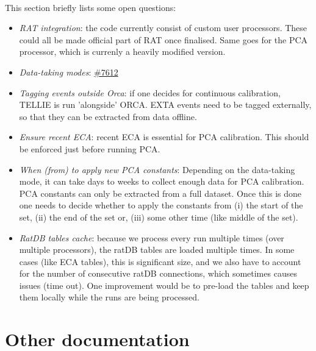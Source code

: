 \documentclass[12pt]{article}
\begin{document}
\paragraph{}
This section briefly lists some open questions:
\begin{itemize}
	\item \textit{RAT integration}: the code currently consist of custom user processors. These could all be made official part of RAT once finalised. Same goes for the PCA processor, which is currenly a heavily modified version.
	\item \textit{Data-taking modes}: \href{https://www.snolab.ca/snoplus/private/DocDB/cgi/ShowDocument?docid=7612}{\#7612}
	\item \textit{Tagging events outside Orca}: if one decides for continuous calibration, TELLIE is run 'alongside' ORCA. EXTA events need to be tagged externally, so that they can be extracted from data offline.
	\item \textit{Ensure recent ECA}: recent ECA is essential for PCA calibration. This should be enforced just before running PCA.
	\item \textit{When (from) to apply new PCA constants}: Depending on the data-taking mode, it can take days to weeks to collect enough data for PCA calibration. PCA constants can only be extracted from a full dataset. Once this is done one needs to decide whether to apply the constants from (i) the start of the set, (ii) the end of the set or, (iii) some other time (like middle of the set).
	\item \textit{RatDB tables cache}: because we process every run multiple times (over multiple processors), the ratDB tables are loaded multiple times. In some cases (like ECA tables), this is significant size, and we also have to account for the number of consecutive ratDB connections, which sometimes causes issues (time out). One improvement would be to pre-load the tables and keep them locally while the runs are being processed. 
\end{itemize}

\section{Other documentation}
\end{document}
